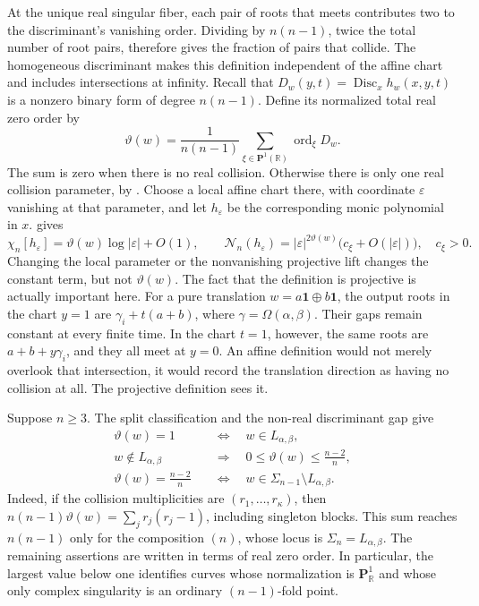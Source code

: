 \documentclass[12pt,reqno]{amsart}
\theoremstyle{definition}
\theoremstyle{remark}
\newcommand{\R}{\mathbb R}
\newcommand{\cN}{\mathcal N}
\newcommand{\eps}{\varepsilon}
\begin{document}
At the unique real singular fiber, each pair of roots that meets contributes two to the discriminant’s vanishing order. Dividing by \(n(n-1)\), twice the total number of root pairs, therefore gives the fraction of pairs that collide. The homogeneous discriminant makes this definition independent of the affine chart and includes intersections at infinity. Recall that \(D_w(y,t)=\operatorname{Disc}_x h_w(x,y,t)\) is a
nonzero binary form of degree \(n(n-1)\).  Define its normalized
total real zero order by
\begin{equation}\label{eq:real-entropy-order}
 \vartheta(w)=\frac{1}{n(n-1)}
    \sum_{\xi\in\mathbf P^1(\R)}\operatorname{ord}_{\xi}D_w.
\end{equation}
The sum is zero when there is no real collision.  Otherwise there is
only one real collision parameter, by
.  Choose a local affine chart
there, with coordinate \(\eps\) vanishing at that parameter, and
let \(h_\eps\) be the corresponding monic polynomial in \(x\).
 gives
\begin{equation}\label{eq:entropy-order-local-meaning}
 \chi_n[h_\eps]=\vartheta(w)\log|\eps|+O(1),
 \qquad
 \cN_n(h_\eps)=|\eps|^{2\vartheta(w)}
                    \bigl(c_\xi+O(|\eps|)\bigr),
 \quad c_\xi>0.
\end{equation}
Changing the local parameter or the nonvanishing projective lift
changes the constant term, but not \(\vartheta(w)\). The fact that the definition is projective is actually important here. For a pure translation \(w=a\mathbf1\oplus b\mathbf1\), the output roots in the chart \(y=1\) are \(\gamma_i+t(a+b)\), where \(\gamma=\Omega(\alpha,\beta)\). Their gaps remain constant at every finite time. In the chart \(t=1\), however, the same roots are \(a+b+y\gamma_i\), and they all meet at \(y=0\). An affine definition would not merely overlook that intersection, it would record the translation direction as having no collision at all. The projective
definition sees it.

Suppose \(n\geq3\).  The split classification and the non-real
discriminant gap give
\begin{align}
 \vartheta(w)=1
 &\quad\Longleftrightarrow\quad w\in L_{\alpha,\beta},
       \label{eq:entropy-order-split}\\
 w\notin L_{\alpha,\beta}
 &\quad\Longrightarrow\quad
       0\leq\vartheta(w)\leq\frac{n-2}{n},
       \label{eq:entropy-order-gap}\\
 \vartheta(w)=\frac{n-2}{n}
 &\quad\Longleftrightarrow\quad
       w\in\Sigma_{n-1}\setminus L_{\alpha,\beta}.
       \label{eq:entropy-order-rational-stratum}
\end{align}
Indeed, if the collision multiplicities are
\((r_1,\ldots,r_{\kappa})\), then
\(n(n-1)\vartheta(w)=\sum_jr_j(r_j-1)\), including singleton
blocks.  This sum reaches \(n(n-1)\) only for the composition
\((n)\), whose locus is
\(\Sigma_n=L_{\alpha,\beta}\).  The remaining assertions are
 written in terms of real zero
order.  In particular, the largest value below one identifies curves
whose normalization is \(\mathbf P^1_{\R}\) and whose only
complex singularity is an ordinary \((n-1)\)-fold point.
\end{document}
